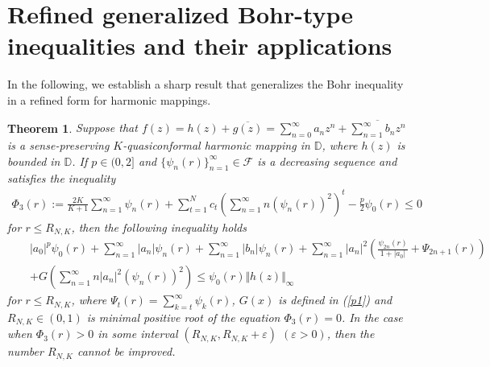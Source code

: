 \documentclass[11pt,reqno]{amsart}
\newtheorem{theo}{Theorem}[section]
\newtheorem{open problem}{Open problem}[section]
\newcommand{\F}{{\mathcal{F}}}
\newcommand{\ol}{\overline}
\newcommand{\beas}{\begin{eqnarray*}}
\newcommand{\eeas}{\end{eqnarray*}}
\newcommand{\bea}{\begin{eqnarray}}
\newcommand{\eea}{\end{eqnarray}}
\renewcommand{\epsilon}{\varepsilon}
\numberwithin{equation}{section}
\begin{document}
\section{Refined generalized Bohr-type inequalities and their applications}
In the following, we establish a sharp result that generalizes the Bohr inequality in a refined form for harmonic mappings.
\begin{theo}\label{T2} Suppose that $f(z)=h(z)+\ol{g(z)}=\sum_{n=0}^\infty a_n z^n+\ol{\sum_{n=1}^\infty b_n z^n}$ is a sense-preserving $K$-quasiconformal harmonic mapping in $\mathbb{D}$, where $h(z)$ is bounded in $\mathbb{D}$. If $p\in(0,2]$ and $\{\psi_n(r)\}_{n=1}^\infty\in\F$ is a decreasing sequence and satisfies the inequality
\bea\label{t2} 
\Phi_3(r):=\frac{2K}{K+1}\sum_{n=1}^\infty \psi_n(r)+\sum_{t=1}^N c_t\left(\sum_{n=1}^\infty n \left(\psi_n(r)\right)^2\right)^t-\frac{p}{2}\psi_0(r)\leq 0\eea
for $ r\leq R_{N,K}$, 
then the following inequality holds 
\beas&& |a_0|^p\psi_0(r)+\sum_{n=1}^\infty |a_n| \psi_n(r)+\sum_{n=1}^\infty |b_n| \psi_n(r)+\sum_{n=1}^\infty |a_n|^2\left(\frac{\psi_{2n}(r)}{1+|a_0|}+\Psi_{2n+1}(r)\right)\\[2mm]
&&+G\left(\sum_{n=1}^\infty n|a_n|^2(\psi_n(r))^2\right)\leq \psi_0(r)\Vert h(z)\Vert_\infty\eeas
for $ r\leq R_{N,K}$,
where $\Psi_t(r)=\sum_{k=t}^\infty \psi_k(r)$, $G(x)$ is defined in (\ref{p1}) and $R_{N,K}\in(0,1)$ is minimal positive root of the equation $\Phi_3(r)=0$.
In the case when $\Phi_3(r)>0$ in some interval $(R_{N,K}, R_{N,K}+\epsilon)$ $(\epsilon>0)$, then the number $R_{N,K}$ cannot be improved.
\end{theo}
\end{document}
